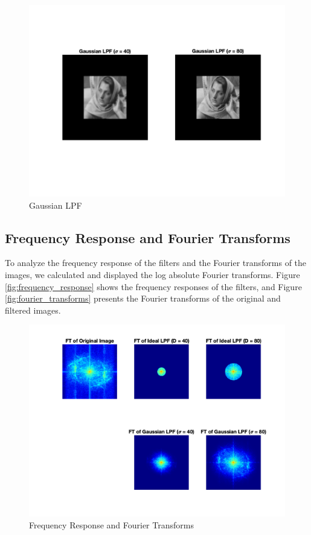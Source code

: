 \documentclass{article}
\begin{document}
\begin{figure}[H]
    \centering
        \includegraphics[width=\linewidth]{Gaussian_Low_Pass.png}
        \caption{Gaussian LPF}
\end{figure}

\subsection{Frequency Response and Fourier Transforms}
To analyze the frequency response of the filters and the Fourier transforms of the images, we calculated and displayed the log absolute Fourier transforms. Figure \ref{fig:frequency_response} shows the frequency responses of the filters, and Figure \ref{fig:fourier_transforms} presents the Fourier transforms of the original and filtered images.

\begin{figure}[H]
    \centering
        \includegraphics[width=\linewidth]{Fourier_Transforms_All.png}
        \caption{Frequency Response and Fourier Transforms}
\end{figure}
\end{document}
